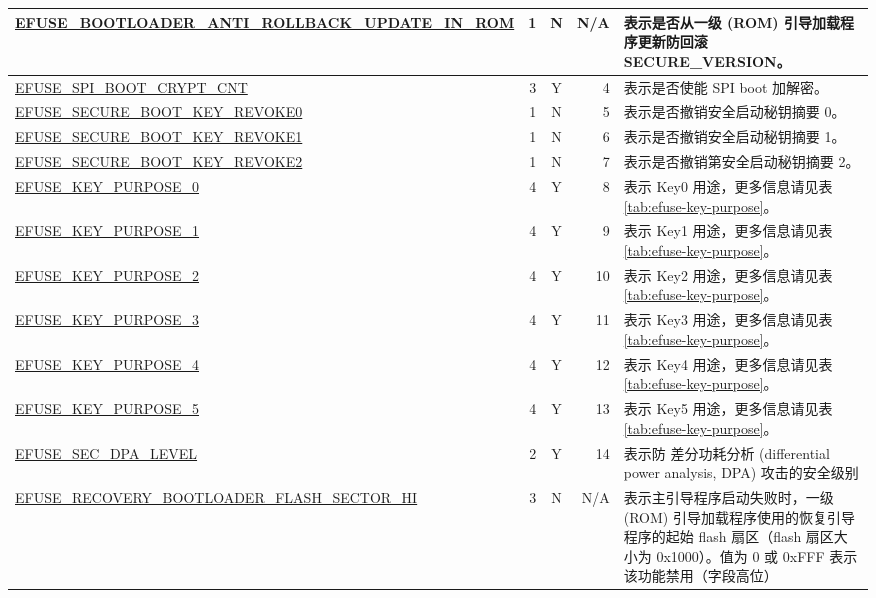 \begin{longtable}[l]{ |m{8.5cm}|r|c|r|m{9.0cm}| }
    \hyperref[fielddesc:EFUSEBOOTLOADERANTIROLLBACKUPDATEINROM]{EFUSE\_\-BOOTLOADER\_\-ANTI\_\-ROLLBACK\_\-UPDATE\_\-IN\_\-ROM} & 1 & N & N/A & 表示是否从一级 (ROM) 引导加载程序更新防回滚 SECURE\_VERSION。 \\ \hline
    \hyperref[fielddesc:EFUSESPIBOOTCRYPTCNT]{EFUSE\_SPI\_BOOT\_CRYPT\_CNT} & 3 & Y & 4 & 表示是否使能 SPI boot 加解密。\\
    \hline
    \hyperref[fielddesc:EFUSESECUREBOOTKEYREVOKE0]{EFUSE\_SECURE\_BOOT\_KEY\_REVOKE0} & 1 & N & 5 & 表示是否撤销安全启动秘钥摘要 0。\\
    \hline
    \hyperref[fielddesc:EFUSESECUREBOOTKEYREVOKE1]{EFUSE\_SECURE\_BOOT\_KEY\_REVOKE1} & 1 & N & 6 & 表示是否撤销安全启动秘钥摘要 1。\\
    \hline
    \hyperref[fielddesc:EFUSESECUREBOOTKEYREVOKE2]{EFUSE\_SECURE\_BOOT\_KEY\_REVOKE2} & 1 & N & 7 & 表示是否撤销第安全启动秘钥摘要 2。\\
    \hline
    \hyperref[fielddesc:EFUSEKEYPURPOSE0]{EFUSE\_KEY\_PURPOSE\_0} & 4 & Y & 8 & 表示 Key0 用途，更多信息请见表 \ref{tab:efuse-key-purpose}。\\
    \hline
    \hyperref[fielddesc:EFUSEKEYPURPOSE1]{EFUSE\_KEY\_PURPOSE\_1} & 4 & Y & 9 & 表示 Key1 用途，更多信息请见表 \ref{tab:efuse-key-purpose}。\\
    \hline
    \hyperref[fielddesc:EFUSEKEYPURPOSE2]{EFUSE\_KEY\_PURPOSE\_2} & 4 & Y & 10 & 表示 Key2 用途，更多信息请见表 \ref{tab:efuse-key-purpose}。\\
    \hline
    \hyperref[fielddesc:EFUSEKEYPURPOSE3]{EFUSE\_KEY\_PURPOSE\_3} & 4 & Y & 11 & 表示 Key3 用途，更多信息请见表 \ref{tab:efuse-key-purpose}。\\
    \hline
    \hyperref[fielddesc:EFUSEKEYPURPOSE4]{EFUSE\_KEY\_PURPOSE\_4} & 4 & Y & 12 & 表示 Key4 用途，更多信息请见表 \ref{tab:efuse-key-purpose}。\\
    \hline
    \hyperref[fielddesc:EFUSEKEYPURPOSE5]{EFUSE\_KEY\_PURPOSE\_5} & 4 & Y & 13 & 表示 Key5 用途，更多信息请见表 \ref{tab:efuse-key-purpose}。\\
    \hline
    \hyperref[fielddesc:EFUSESECDPALEVEL]{EFUSE\_SEC\_DPA\_LEVEL} & 2 & Y & 14 & 表示防
差分功耗分析 (differential power analysis, DPA) 攻击的安全级别 \\
    \hline
    \hyperref[fielddesc:EFUSERECOVERYBOOTLOADERFLASHSECTORHI]{EFUSE\_RECOVERY\_BOOTLOADER\_FLASH\_SECTOR\_HI} & 3 & N & N/A & 表示主引导程序启动失败时，一级 (ROM) 引导加载程序使用的恢复引导程序的起始 flash 扇区（flash 扇区大小为 0x1000）。值为 0 或 0xFFF 表示该功能禁用（字段高位） \\ \hline

\end{longtable}
